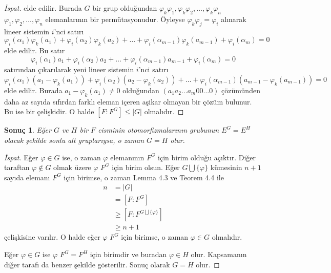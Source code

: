 \documentclass[draft]{article}
\newtheorem{cor}[thm]{Sonuç}
\theoremstyle{definition}
\theoremstyle{remark}
\newcommand{\envert}[1]{\left\lvert#1\right\rvert}
\let\abs=\envert
\begin{document}
\begin{proof}[İspat]
    	        elde edilir. Burada $G$ bir grup olduğundan $\varphi_k\varphi_1, \varphi_k\varphi_2, \dots, \varphi_k\varphi_n$ $\varphi_1, \varphi_2, \dots, \varphi_n$ elemanlarının bir permütasyonudur. Öyleyse $\varphi_k\varphi_j = \varphi_i$ alınarak lineer sistemin $i$'nci satırı
    	        \begin{equation*}
    	            \varphi_i(\alpha_1)\varphi_k(a_1) + \varphi_i(\alpha_2)\varphi_k(a_2) + \dots + \varphi_i(\alpha_{m - 1})\varphi_k(a_{m - 1}) + \varphi_i(\alpha_m) = 0
    	        \end{equation*}
    	        elde edilir. Bu satır
    	        \begin{equation*}
    	            \varphi_i(\alpha_1)a_1 + \varphi_i(\alpha_2)a_2 + \dots + \varphi_i(\alpha_{m - 1})a_{m - 1} + \varphi_i(\alpha_m) = 0
    	        \end{equation*}
    	        satırından çıkarılarak yeni lineer sistemin $i$'nci satırı
    	        \begin{equation*}
    	            \varphi_i(\alpha_1)(a_1 - \varphi_k(a_1)) + \varphi_i(\alpha_2)(a_2 - \varphi_k(a_2)) + \dots + \varphi_i(\alpha_{m - 1})(a_{m - 1} - \varphi_k(a_{m - 1})) = 0
    	        \end{equation*}
    	        elde edilir. Burada $a_1 - \varphi_k(a_1) \neq 0$ olduğundan $(a_1 a_2 \dots a_m 0 0 \dots 0)$ çözümünden daha az sayıda sıfırdan farklı eleman içeren aşikar olmayan bir çözüm bulunur. Bu ise bir çelişkidir. O halde $[F : F^G] \leq \abs{G}$ olmalıdır.
    	    \end{proof}
    		
    		\begin{cor}
    		    Eğer $G$ ve $H$ bir $F$ cisminin otomorfizmalarının grubunun $E^G = E^H$ olacak şekilde sonlu alt gruplarıysa, o zaman $G = H$ olur.
    		\end{cor}
    		
    		\begin{proof}[İspat]
    	        Eğer $\varphi \in G$ ise, o zaman $\varphi$ elemanının $F^G$ için birim olduğu açıktır. Diğer taraftan $\varphi \notin G$ olmak üzere $\varphi$ $F^G$ için birim olsun. Eğer $G \bigcup \{\varphi\}$ kümesinin $n + 1$ sayıda elemanı $F^G$ için birimse, o zaman Lemma 4.3 ve Teorem 4.4 ile
    	        \begin{align*}
    	            n &= \abs{G}\\
    	            &= [F : F^G]\\
    	            &\geq [F : F^{G \bigcup \{\varphi\}}]\\
    	            &\geq n + 1
    	        \end{align*}
    	        çelişkisine varılır. O halde eğer $\varphi$ $F^G$ için birimse, o zaman $\varphi \in G$ olmalıdır.\par
    	        Eğer $\varphi \in G$ ise $\varphi$ $F^G = F^H$ için birimdir ve buradan $\varphi \in H$ olur. Kapsamanın diğer tarafı da benzer şekilde gösterilir. Sonuç olarak $G = H$ olur.
    	    \end{proof}
    		
\end{document}
